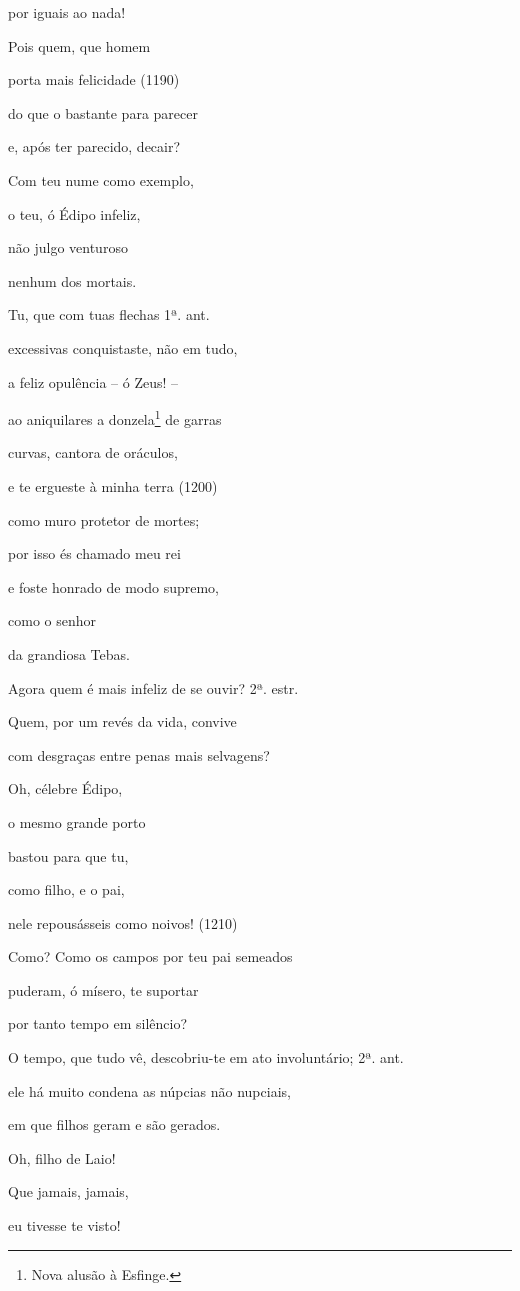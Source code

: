por iguais ao nada!

Pois quem, que homem

porta mais felicidade (1190)

do que o bastante para parecer

e, após ter parecido, decair?

Com teu nume como exemplo,

o teu, ó Édipo infeliz,

não julgo venturoso

nenhum dos mortais.

Tu, que com tuas flechas 1ª. ant.

excessivas conquistaste, não em tudo,

a feliz opulência -- ó Zeus! --

ao aniquilares a donzela\footnote{Nova alusão à Esfinge.} de garras

curvas, cantora de oráculos,

e te ergueste à minha terra (1200)

como muro protetor de mortes;

por isso és chamado meu rei

e foste honrado de modo supremo,

como o senhor

da grandiosa Tebas.

Agora quem é mais infeliz de se ouvir? 2ª. estr.

Quem, por um revés da vida, convive

com desgraças entre penas mais selvagens?

Oh, célebre Édipo,

o mesmo grande porto

bastou para que tu,

como filho, e o pai,

nele repousásseis como noivos! (1210)

Como? Como os campos por teu pai semeados

puderam, ó mísero, te suportar

por tanto tempo em silêncio?

O tempo, que tudo vê, descobriu-te em ato involuntário; 2ª. ant.

ele há muito condena as núpcias não nupciais,

em que filhos geram e são gerados.

Oh, filho de Laio!

Que jamais, jamais,

eu tivesse te visto!

